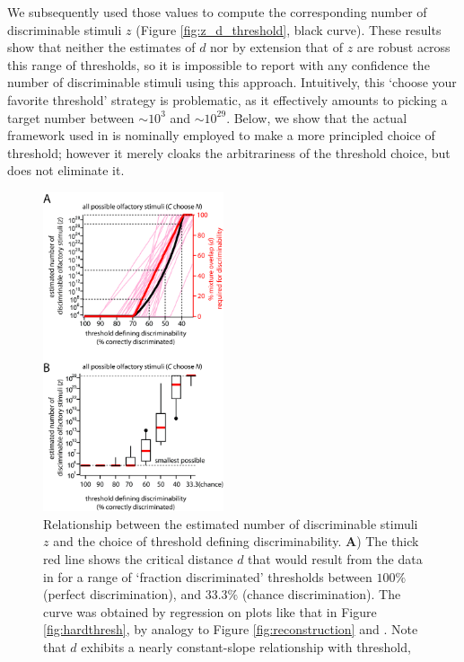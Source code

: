 \documentclass[letterpaper,twocolumn,10pt]{article}
\begin{document}
We subsequently used those values to compute the corresponding number of discriminable stimuli $z$ (Figure \ref{fig:z_d_threshold}, black curve).  
These results show that neither the estimates of $d$ nor by extension that of $z$ are robust across this range of thresholds, 
so it is impossible to report with any confidence the number of discriminable stimuli using this approach. 
Intuitively, this `choose your favorite threshold' strategy is problematic, 
as it effectively amounts to picking a target number between $\sim 10^{3}$ and $\sim 10^{29}$. 
Below, we show that the actual framework used in \cite{bushdid_humans_2014} is nominally employed to make a more principled choice of threshold;
however it merely cloaks the arbitrariness of the threshold choice, but does not eliminate it. 

\begin{figure}[!hbtp]
    \centering
    \includegraphics[width=0.475\textwidth]{figures/Fig7_Z_D_vs_threshold}
    \caption{
Relationship between the estimated number of discriminable stimuli $z$ and the choice of threshold defining discriminability. 
\textbf{A}) The thick red line shows the critical distance $d$ that would result from the data in \cite{bushdid_humans_2014} 
for a range of `fraction discriminated' thresholds between $100\%$ (perfect discrimination), 
and $33.3\%$ (chance discrimination). 
The curve was obtained by regression on plots like that in Figure \ref{fig:hardthresh}, by analogy to Figure \ref{fig:reconstruction} and \cite{bushdid_humans_2014}. 
Note that $d$ exhibits a nearly constant-slope relationship with threshold, 
}
\end{figure}
\end{document}
